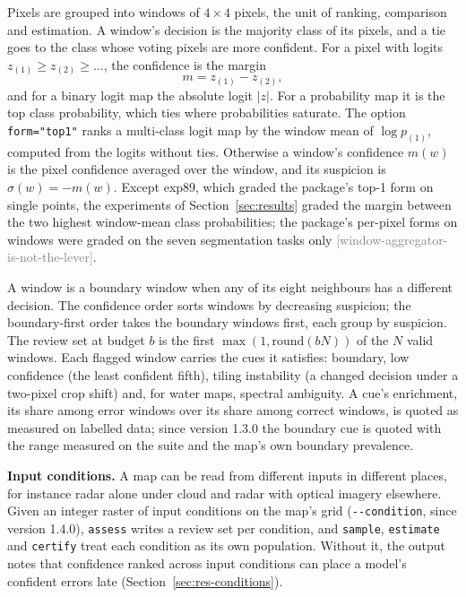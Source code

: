 \documentclass[11pt,a4paper]{article}
\newcommand{\claim}[1]{{\scriptsize\textsf{\textcolor{gray}{[#1]}}}}
\newcommand{\code}[1]{\texttt{#1}}
\begin{document}
Pixels are grouped into windows of $4\times4$ pixels, the unit of ranking, comparison and estimation. A window's
decision is the majority class of its pixels, and a tie goes to the class whose voting pixels are more
confident. For a pixel with logits $z_{(1)} \ge z_{(2)} \ge \dots$, the confidence is the margin
\begin{equation}
  m = z_{(1)} - z_{(2)},
\end{equation}
and for a binary logit map the absolute logit $|z|$. For a probability map it is the top class probability, which ties
where probabilities saturate. The option \code{form="top1"} ranks a multi-class logit map by the window mean of
$\log p_{(1)}$, computed from the logits without ties. Otherwise a window's confidence $m(w)$ is the pixel confidence
averaged over the window, and its suspicion is $\sigma(w) = -m(w)$. Except exp89, which graded the package's top-1
form on single points, the experiments of Section~\ref{sec:results} graded the margin between the two highest
window-mean class probabilities; the package's per-pixel forms on windows were graded on the seven segmentation tasks
only \claim{window-aggregator-is-not-the-lever}.

A window is a boundary window when any of its eight neighbours has a different decision. The confidence order sorts
windows by decreasing suspicion; the boundary-first order takes the boundary windows first, each group by suspicion.
The review set at budget $b$ is the first $\max(1, \mathrm{round}(bN))$ of the $N$ valid windows. Each flagged window
carries the cues it satisfies: boundary, low confidence (the least confident fifth), tiling instability (a changed
decision under a two-pixel crop shift) and, for water maps, spectral ambiguity. A cue's enrichment, its share among
error windows over its share among correct windows, is quoted as measured on labelled data; since version 1.3.0 the
boundary cue is quoted with the range measured on the suite and the map's own boundary prevalence.

\textbf{Input conditions.} A map can be read from different inputs in different places, for instance radar alone
under cloud and radar with optical imagery elsewhere. Given an integer raster of input conditions on the map's grid
(\code{-{}-condition}, since version 1.4.0), \code{assess} writes a review set per condition, and \code{sample},
\code{estimate} and \code{certify} treat each condition as its own population. Without it, the output notes that
confidence ranked across input conditions can place a model's confident errors late (Section~\ref{sec:res-conditions}).
\end{document}
